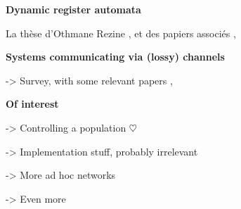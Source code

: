 	\textbf{Dynamic register automata}
	
	La thèse d'Othmane Rezine \cite{Rezine2017verification}, et des papiers associés 
	\cite{AbdullaAKR2014verification},
	\cite{AbdullaAKR2015verification}
	
	\textbf{Systems communicating via (lossy) channels}
	
	\cite{Aiswarya2021network} -> Survey, with some relevant papers 	\cite{Aiswarya2015model},
	\cite{AbdullaAA2016data}
	
	\textbf{Of interest}
	
	\cite{BertrandDGGG2018controlling} -> Controlling a population $\heartsuit$
	
	\cite{baldoni2009implementing} -> Implementation stuff, probably irrelevant
	 	
	\cite{DelzannoSZ2011cliquesAdhoc} -> More ad hoc networks
	
	\cite{DBLP:journals/tcs/AbdullaDRST16} -> Even more
	
